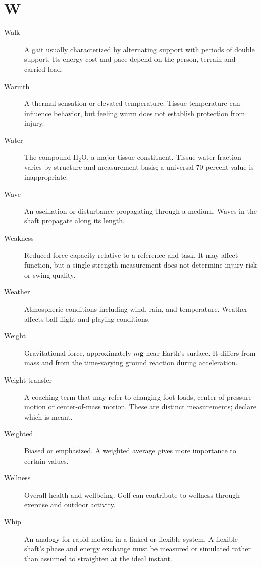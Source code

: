 \section*{W}
\begin{description}

\item[Walk] A gait usually characterized by alternating support with periods of double support. Its energy cost and pace depend on the person, terrain and carried load.

\item[Warmth] A thermal sensation or elevated temperature. Tissue temperature can influence behavior, but feeling warm does not establish protection from injury.

\item[Water] The compound $\mathrm{H_2O}$, a major tissue constituent. Tissue water fraction varies by structure and measurement basis; a universal 70 percent value is inappropriate.

\item[Wave] An oscillation or disturbance propagating through a medium. Waves in the shaft propagate along its length.

\item[Weakness] Reduced force capacity relative to a reference and task. It may affect function, but a single strength measurement does not determine injury risk or swing quality.

\item[Weather] Atmospheric conditions including wind, rain, and temperature. Weather affects ball flight and playing conditions.

\item[Weight] Gravitational force, approximately $m\mathbf{g}$ near Earth's surface. It differs from mass and from the time-varying ground reaction during acceleration.

\item[Weight transfer] A coaching term that may refer to changing foot loads, center-of-pressure motion or center-of-mass motion. These are distinct measurements; declare which is meant.

\item[Weighted] Biased or emphasized. A weighted average gives more importance to certain values.

\item[Wellness] Overall health and wellbeing. Golf can contribute to wellness through exercise and outdoor activity.

\item[Whip] An analogy for rapid motion in a linked or flexible system. A flexible shaft's phase and energy exchange must be measured or simulated rather than assumed to straighten at the ideal instant.


\end{description}
